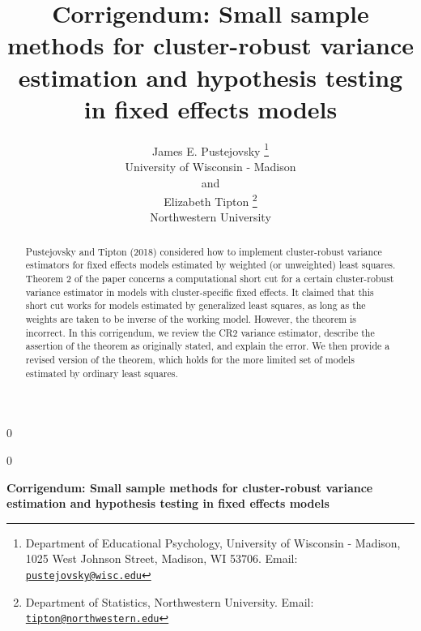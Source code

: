 \documentclass[12pt]{article}
\newcommand{\blind}{0}
\begin{document}
\def\spacingset#1{\renewcommand{\baselinestretch}%
{#1}\small\normalsize} \spacingset{1}



\blind
{
  \title{\bf Corrigendum: Small sample methods for cluster-robust
variance estimation and hypothesis testing in fixed effects models}

  \author{
        James E. Pustejovsky \thanks{Department of Educational
Psychology, University of Wisconsin - Madison, 1025 West Johnson Street,
Madison, WI 53706. Email:
\href{mailto:pustejovsky@wisc.edu}{\nolinkurl{pustejovsky@wisc.edu}}} \\
    University of Wisconsin - Madison\\
     and \\     Elizabeth Tipton \thanks{Department of Statistics,
Northwestern University. Email:
\href{mailto:tipton@northwestern.edu}{\nolinkurl{tipton@northwestern.edu}}} \\
    Northwestern University\\
      }
  \maketitle
} \fi

\blind
{
  \bigskip
  \bigskip
  \bigskip
  \begin{center}
    {\LARGE\bf Corrigendum: Small sample methods for cluster-robust
variance estimation and hypothesis testing in fixed effects models}
  \end{center}
  \medskip
} \fi

\bigskip
\begin{abstract}
Pustejovsky and Tipton (2018) considered how to implement cluster-robust
variance estimators for fixed effects models estimated by weighted (or
unweighted) least squares. Theorem 2 of the paper concerns a
computational short cut for a certain cluster-robust variance estimator
in models with cluster-specific fixed effects. It claimed that this
short cut works for models estimated by generalized least squares, as
long as the weights are taken to be inverse of the working model.
However, the theorem is incorrect. In this corrigendum, we review the
CR2 variance estimator, describe the assertion of the theorem as
originally stated, and explain the error. We then provide a revised
version of the theorem, which holds for the more limited set of models
estimated by ordinary least squares.
\end{abstract}
\end{document}
